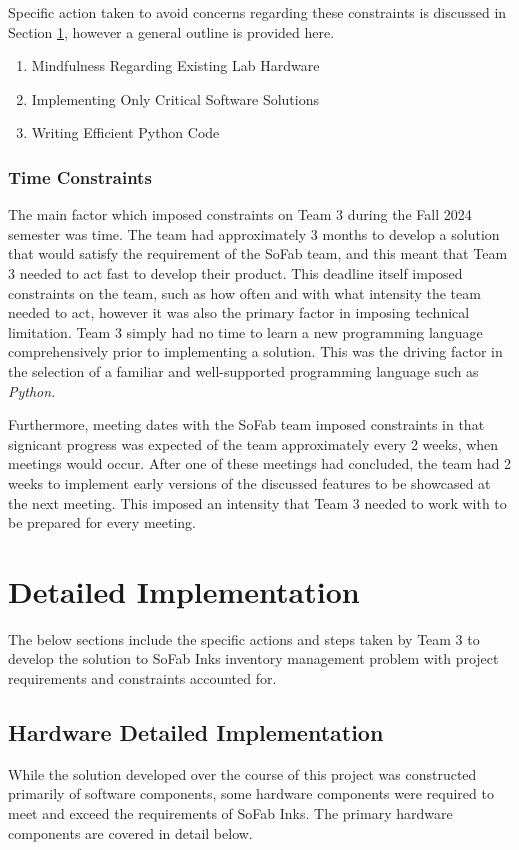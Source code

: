 \documentclass{article}
\begin{document}
Specific action taken to avoid concerns regarding these constraints is discussed in Section \ref{sec:det-imp}, however a general outline
is provided here. 
\begin{enumerate}
    \item Mindfulness Regarding Existing Lab Hardware
    \item Implementing Only Critical Software Solutions
    \item Writing Efficient Python Code
\end{enumerate}
\subsubsection{Time Constraints}
The main factor which imposed constraints on Team 3 during the Fall 2024 semester was time. The team had approximately 3 months to develop
a solution that would satisfy the requirement of the SoFab team, and this meant that Team 3 needed to act fast to develop their product.
This deadline itself imposed constraints on the team, such as how often and with what intensity the team needed to act, however it was 
also the primary factor in imposing technical limitation. Team 3 simply had no time to learn a new programming language 
comprehensively 
prior to implementing a solution. This was the driving factor in the selection of a familiar and well-supported programming language 
such as \textit{Python.} 

Furthermore, meeting dates with the SoFab team imposed constraints in that signicant progress was expected of the team approximately
every 2 weeks, when meetings would occur. After one of these meetings had concluded, the team had 2 weeks to implement early versions
of the discussed features to be showcased at the next meeting. This imposed an intensity that Team 3 needed to work with to be prepared
for every meeting. 

\section{Detailed Implementation} 
\label{sec:det-imp}
The below sections include the specific actions and steps taken by Team 3 to develop the solution to SoFab Inks inventory management
problem with project requirements and constraints accounted for. 
\subsection{Hardware Detailed Implementation}
While the solution developed over the course of this project was constructed primarily of software components, some hardware components 
were required to meet and exceed the requirements of SoFab Inks. The primary hardware components are covered in detail below.
\end{document}
